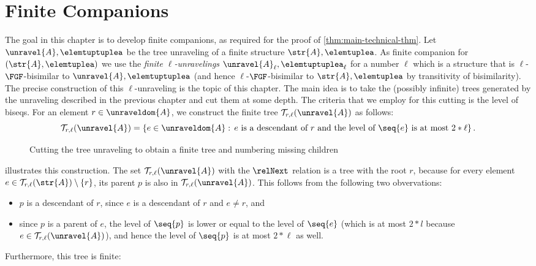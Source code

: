 \chapter{Finite Companions}\label{chap:finite}
The goal in this chapter is to develop finite companions, as required for the proof of \cref{thm:main-technical-thm}.
Let $\unravel{A}, \elemtuptuplea$ be the tree unraveling of a finite structure $\str{A}, \elemtuplea$.
As finite companion for $(\str{A}, \elemtuplea)$ we use the \emph{finite $\ell$-unravelings} $\unravel{A}_{\ell}, \elemtuptuplea_{\ell}$ for a number $\ell$ which is a structure that is $\ell$-$\FGF$-bisimilar to $\unravel{A}, \elemtuptuplea$ (and hence $\ell$-$\FGF$-bisimilar to $\str{A}, \elemtuplea$ by transitivity of bisimilarity).
The precise construction of this $\ell$-unraveling is the topic of this chapter.
The main idea is to take the (possibly infinite) trees generated by the unraveling described in the previous chapter and cut them at some depth.
The criteria that we employ for this cutting is the level of biseqs.
For an element $r \in \unraveldom{A}$, we construct the finite tree $\mathcal{T}_{r,\ell}(\unravel{A})$ as follows:
\begin{equation*}
  \mathcal{T}_{r,\ell}(\unravel{A}) = \left\{ e \in \unraveldom{A}:\, e\ \text{is a descendant of $r$ and the level of $\seq{e}$ is at most $2 * \ell$} \right\}.
\end{equation*}
\begin{figure}%
  \centering
  
  \caption{Cutting the tree unraveling to obtain a finite tree and numbering missing children}\label{fig:cutting}
\end{figure}%
 illustrates this construction.
The set $\mathcal{T}_{r,\ell}(\unravel{A})$ with the $\relNext$ relation is a tree with the root $r$, because for every element $e \in \mathcal{T}_{r,\ell}(\str{A}) \setminus \{r\}$, its parent $p$ is also in $\mathcal{T}_{r,\ell}(\unravel{A})$.
This follows from the following two obvervations:
\begin{itemize}
  \item $p$ is a descendant of $r$, since $e$ is a descendant of $r$ and $e \neq r$, and
  \item since $p$ is a parent of $e$, the level of $\seq{p}$ is lower or equal to the level of $\seq{e}$ (which is at most $2 * l$ because $e \in \mathcal{T}_{r,\ell}(\unravel{A})$), and hence the level of $\seq{p}$ is at most $2 * \ell$ as well.
\end{itemize}
Furthermore, this tree is finite:
